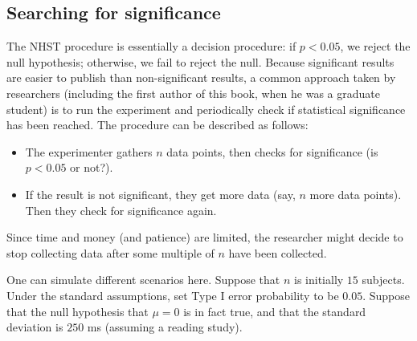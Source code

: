 \documentclass[
  12pt,
]{krantz}
\newenvironment{Shaded}{\begin{snugshade}}{\end{snugshade}}
\newcommand{\AttributeTok}[1]{\textcolor[rgb]{0.77,0.63,0.00}{#1}}
\newcommand{\ConstantTok}[1]{\textcolor[rgb]{0.00,0.00,0.00}{#1}}
\newcommand{\ControlFlowTok}[1]{\textcolor[rgb]{0.13,0.29,0.53}{\textbf{#1}}}
\newcommand{\DecValTok}[1]{\textcolor[rgb]{0.00,0.00,0.81}{#1}}
\newcommand{\DocumentationTok}[1]{\textcolor[rgb]{0.56,0.35,0.01}{\textbf{\textit{#1}}}}
\newcommand{\FunctionTok}[1]{\textcolor[rgb]{0.00,0.00,0.00}{#1}}
\newcommand{\NormalTok}[1]{#1}
\newcommand{\OtherTok}[1]{\textcolor[rgb]{0.56,0.35,0.01}{#1}}
\newcommand{\SpecialCharTok}[1]{\textcolor[rgb]{0.00,0.00,0.00}{#1}}
\providecommand{\tightlist}{%
  \setlength{\itemsep}{0pt}\setlength{\parskip}{0pt}}
\theoremstyle{definition}
\theoremstyle{definition}
\theoremstyle{definition}
\theoremstyle{definition}
\theoremstyle{remark}
\begin{document}
\hypertarget{searching-for-significance}{%
\subsection{Searching for significance}\label{searching-for-significance}}

The NHST procedure is essentially a decision procedure: if \(p<0.05\), we reject the null hypothesis; otherwise, we fail to reject the null. Because significant results are easier to publish than non-significant results, a common approach taken by researchers (including the first author of this book, when he was a graduate student) is to run the experiment and periodically check if statistical significance has been reached. The procedure can be described as follows:

\begin{itemize}
\tightlist
\item
  The experimenter gathers \(n\) data points, then checks for significance (is \(p<0.05\) or not?).
\item
  If the result is not significant, they get more data (say, \(n\) more data points). Then they check for significance again.
\end{itemize}

Since time and money (and patience) are limited, the researcher might decide to stop collecting data after some multiple of \(n\) have been collected.

One can simulate different scenarios here. Suppose that \(n\) is initially \(15\) subjects.\\
Under the standard assumptions, set Type I error probability to be \(0.05\). Suppose that the null hypothesis that \(\mu=0\) is in fact true, and that the standard deviation is \(250\) ms (assuming a reading study).

\begin{Shaded}
\end{Shaded}
\end{document}
